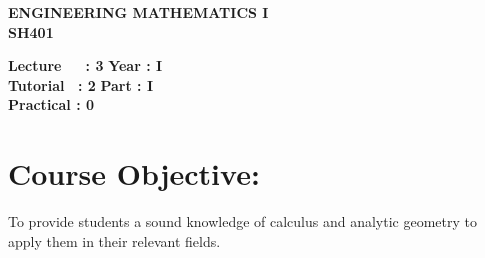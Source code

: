 \begin{center}
    \textbf{\huge{\uppercase{Engineering Mathematics I}}}
    \\
    \vspace{.5cm}
    \textbf{\large{SH401}}
\end{center}

\noindent\textbf{Lecture\ \ \ : 3} \hfill \textbf{Year : I } \\
\textbf{Tutorial \ : 2} \hfill \textbf{Part : I } \\
\textbf{Practical : 0}  \\

\par
\noindent 
\section*{Course Objective:}
To provide students a sound knowledge of calculus and analytic geometry to apply them in their relevant fields.

